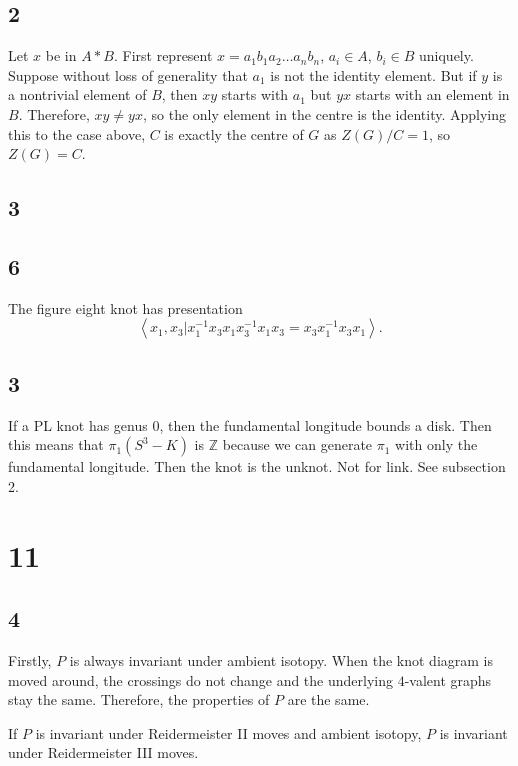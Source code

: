 \documentclass{article}
\theoremstyle{definition}
\numberwithin{theorem}{section}
\numberwithin{equation}{section}
\begin{document}
\subsection{2}
Let $x$ be in $A * B$. First represent $x = a_1 b_1 a_2 \ldots a_n b_n$, $a_i \in A$, $b_i \in B$ uniquely. Suppose without loss of generality that $a_1$ is not the identity element. But if $y$ is a nontrivial element of $B$, then $xy$ starts with $a_1$ but $yx$ starts with an element in $B$. Therefore, $xy \neq yx$, so the only element in the centre is the identity. Applying this to the case above, $C$ is exactly the centre of $G$ as $Z(G)/C = 1$, so $Z(G) = C$. 

\subsection{3}


\subsection{6}
The figure eight knot has presentation 
\begin{equation*}
    \left\langle
        x_1, x_3 | x_1^{-1} x_3 x_1 x_3^{-1} x_1 x_3 = x_3 x_1^{-1} x_3 x_1
    \right\rangle.
\end{equation*}




\subsection{3}
If a PL knot has genus 0, then the fundamental longitude bounds a disk. Then this means that $\pi_1(S^3 - K)$ is $\mathbb{Z}$ because we can generate $\pi_1$ with only the fundamental longitude. Then the knot is the unknot. Not for link. See subsection 2.


\section{11}

\subsection{4}

Firstly, $P$ is always invariant under ambient isotopy. When the knot diagram is moved around, the crossings do not change and the underlying $4$-valent graphs stay the same. Therefore, the properties of $P$ are the same.  

If $P$ is invariant under Reidermeister II moves and ambient isotopy, $P$ is invariant under Reidermeister III moves. 
\end{document}
